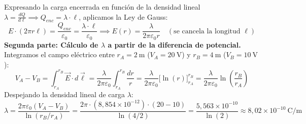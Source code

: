 \begin{ejercicio}
\begin{equation}
\end{equation}
Expresando la carga encerrada en función de la densidad lineal $\lambda = \frac{dQ}{d\ell} \implies Q_{enc} = \lambda \cdot \ell$, aplicamos la Ley de Gauss:
\begin{equation}
    E \cdot (2\pi r \ell) = \frac{Q_{enc}}{\varepsilon_0} = \frac{\lambda \cdot \ell}{\varepsilon_0} \implies \boxed{E(r) = \frac{\lambda}{2\pi\varepsilon_0 r}} \quad (\text{se cancela la longitud }\ell)
\end{equation}
\textbf{Segunda parte: Cálculo de $\lambda$ a partir de la diferencia de potencial.}
Integramos el campo eléctrico entre $r_A = 2\ \si{\meter}$ ($V_A = 20\ \si{\volt}$) y $r_B = 4\ \si{\meter}$ ($V_B = 10\ \si{\volt}$):
\begin{equation}
    V_A - V_B = \int_{r_A}^{r_B} \vec{E} \cdot d\vec{\ell} = \frac{\lambda}{2\pi\varepsilon_0} \int_{r_A}^{r_B} \frac{dr}{r} = \frac{\lambda}{2\pi\varepsilon_0} \Big[\ln(r)\Big]_{r_A}^{r_B} = \frac{\lambda}{2\pi\varepsilon_0} \ln\left(\frac{r_B}{r_A}\right)
\end{equation}
Despejando la densidad lineal de carga $\lambda$:
\begin{equation}
    \lambda = \frac{2\pi\varepsilon_0 (V_A - V_B)}{\ln(r_B / r_A)} = \frac{2\pi \cdot (8{,}854 \times 10^{-12}) \cdot (20 - 10)}{\ln(4 / 2)} = \frac{5{,}563 \times 10^{-10}}{\ln(2)} \approx 8{,}02 \times 10^{-10}\ \si{\coulomb\per\meter}
\end{equation}
\end{ejercicio}

